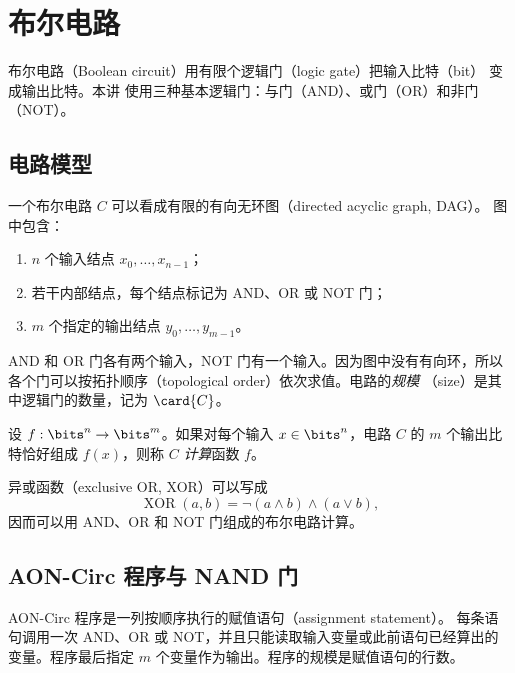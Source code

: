 \chapter{布尔电路}
\label{chap:boolean-circuits}

布尔电路（Boolean circuit）用有限个逻辑门（logic gate）把输入比特（bit）
变成输出比特。本讲
使用三种基本逻辑门：与门（AND）、或门（OR）和非门（NOT）。

\section{电路模型}

一个布尔电路 $C$ 可以看成有限的有向无环图（directed acyclic graph, DAG）。
图中包含：

\begin{enumerate}[label=\arabic*.]
  \item $n$ 个输入结点 $x_0,\ldots,x_{n-1}$；
  \item 若干内部结点，每个结点标记为 AND、OR 或 NOT 门；
  \item $m$ 个指定的输出结点 $y_0,\ldots,y_{m-1}$。
\end{enumerate}

AND 和 OR 门各有两个输入，NOT 门有一个输入。因为图中没有有向环，所以
各个门可以按拓扑顺序（topological order）依次求值。电路的\emph{规模}
（size）是其中逻辑门的数量，记为 $\card{C}$。

\begin{definition}[电路计算]
  \label{def:circuit-computes}
  设 $f:\bits^n\to\bits^m$。如果对每个输入
  $x\in\bits^n$，电路 $C$ 的 $m$ 个输出比特恰好组成 $f(x)$，则称
  $C$ \emph{计算}函数 $f$。
\end{definition}

\begin{example}
  \label{ex:xor-circuit}
  异或函数（exclusive OR, XOR）可以写成
  \[
    \operatorname{XOR}(a,b)
    =\neg(a\land b)\land(a\lor b),
  \]
  因而可以用 AND、OR 和 NOT 门组成的布尔电路计算。
\end{example}

\section{AON-Circ 程序与 NAND 门}

\begin{definition}
  \label{def:aon-circ-program}
  AON-Circ 程序是一列按顺序执行的赋值语句（assignment statement）。
  每条语句调用一次 AND、OR
  或 NOT，并且只能读取输入变量或此前语句已经算出的变量。程序最后指定
  $m$ 个变量作为输出。程序的规模是赋值语句的行数。
\end{definition}

